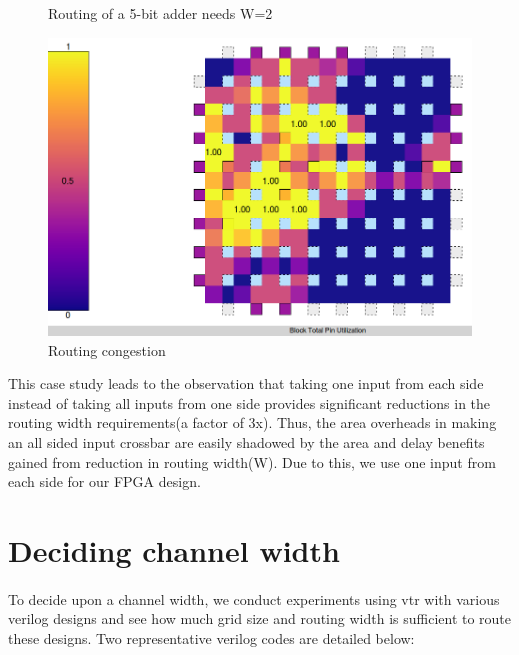 \begin{itemize}
\begin{figure}[H]
\caption{Routing of a 5-bit adder needs W=2}
\label{fig:Figure}
\end{figure}
\begin{figure}[H]
\centering
\includegraphics[scale=0.32]{BTP_work/5-bit_adder_on_spread_IO_clb/routing_congestion.png}
\caption{Routing congestion}
\label{fig:Figure}
\end{figure}

\end{itemize}
This case study leads to the observation that taking one input from each side instead of taking all inputs from one side provides significant reductions in the routing width requirements(a factor of 3x). Thus, the area overheads in making an all sided input crossbar are easily shadowed by the area and delay benefits gained from reduction in routing width(W). Due to this, we use one input from each side for our FPGA design. 

\section{Deciding channel width}
\paragraph{}
To decide upon a channel width, we conduct experiments using vtr with various verilog designs and see how much grid size and routing width is sufficient to route these designs. Two representative verilog codes are detailed below:


